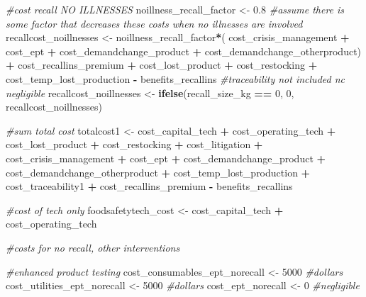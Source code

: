 \documentclass[
]{article}
\newenvironment{Shaded}{\begin{snugshade}}{\end{snugshade}}
\newcommand{\CommentTok}[1]{\textcolor[rgb]{0.56,0.35,0.01}{\textit{#1}}}
\newcommand{\DecValTok}[1]{\textcolor[rgb]{0.00,0.00,0.81}{#1}}
\newcommand{\FloatTok}[1]{\textcolor[rgb]{0.00,0.00,0.81}{#1}}
\newcommand{\FunctionTok}[1]{\textcolor[rgb]{0.13,0.29,0.53}{\textbf{#1}}}
\newcommand{\NormalTok}[1]{#1}
\newcommand{\OtherTok}[1]{\textcolor[rgb]{0.56,0.35,0.01}{#1}}
\newcommand{\SpecialCharTok}[1]{\textcolor[rgb]{0.81,0.36,0.00}{\textbf{#1}}}
\begin{document}
\begin{Shaded}
\begin{Highlighting}[]
\CommentTok{\#cost recall NO ILLNESSES}
\NormalTok{noillness\_recall\_factor }\OtherTok{\textless{}{-}} \FloatTok{0.8} \CommentTok{\#assume there is some factor that decreases these costs when no illnesses are involved}
\NormalTok{recallcost\_noillnesses }\OtherTok{\textless{}{-}}\NormalTok{ noillness\_recall\_factor}\SpecialCharTok{*}\NormalTok{( cost\_crisis\_management }\SpecialCharTok{+}\NormalTok{ cost\_ept }\SpecialCharTok{+}\NormalTok{ cost\_demandchange\_product }\SpecialCharTok{+}\NormalTok{ cost\_demandchange\_otherproduct) }\SpecialCharTok{+}\NormalTok{ cost\_recallins\_premium }\SpecialCharTok{+}\NormalTok{ cost\_lost\_product }\SpecialCharTok{+}\NormalTok{ cost\_restocking }\SpecialCharTok{+}\NormalTok{  cost\_temp\_lost\_production  }\SpecialCharTok{{-}}\NormalTok{ benefits\_recallins }\CommentTok{\#traceability not included nc negligible}
\NormalTok{recallcost\_noillnesses }\OtherTok{\textless{}{-}} \FunctionTok{ifelse}\NormalTok{(recall\_size\_kg }\SpecialCharTok{==} \DecValTok{0}\NormalTok{, }\DecValTok{0}\NormalTok{, recallcost\_noillnesses)}


\CommentTok{\#sum total cost}
\NormalTok{totalcost1 }\OtherTok{\textless{}{-}}\NormalTok{ cost\_capital\_tech }\SpecialCharTok{+}\NormalTok{ cost\_operating\_tech }\SpecialCharTok{+}\NormalTok{ cost\_lost\_product }\SpecialCharTok{+}\NormalTok{ cost\_restocking }\SpecialCharTok{+}\NormalTok{ cost\_litigation }\SpecialCharTok{+}\NormalTok{ cost\_crisis\_management }\SpecialCharTok{+}\NormalTok{ cost\_ept }\SpecialCharTok{+}\NormalTok{ cost\_demandchange\_product }\SpecialCharTok{+}\NormalTok{ cost\_demandchange\_otherproduct }\SpecialCharTok{+}\NormalTok{ cost\_temp\_lost\_production }\SpecialCharTok{+}\NormalTok{ cost\_traceability1 }\SpecialCharTok{+}\NormalTok{ cost\_recallins\_premium }\SpecialCharTok{{-}}\NormalTok{ benefits\_recallins}


\CommentTok{\#cost of tech only}
\NormalTok{foodsafetytech\_cost }\OtherTok{\textless{}{-}}\NormalTok{ cost\_capital\_tech }\SpecialCharTok{+}\NormalTok{ cost\_operating\_tech}


\CommentTok{\#costs for no recall, other interventions}

\CommentTok{\#enhanced product testing}
\NormalTok{cost\_consumables\_ept\_norecall }\OtherTok{\textless{}{-}} \DecValTok{5000} \CommentTok{\#dollars}
\NormalTok{cost\_utilities\_ept\_norecall }\OtherTok{\textless{}{-}} \DecValTok{5000} \CommentTok{\#dollars}
\NormalTok{cost\_ept\_norecall }\OtherTok{\textless{}{-}} \DecValTok{0} \CommentTok{\#negligible}


\end{Highlighting}
\end{Shaded}
\end{document}
